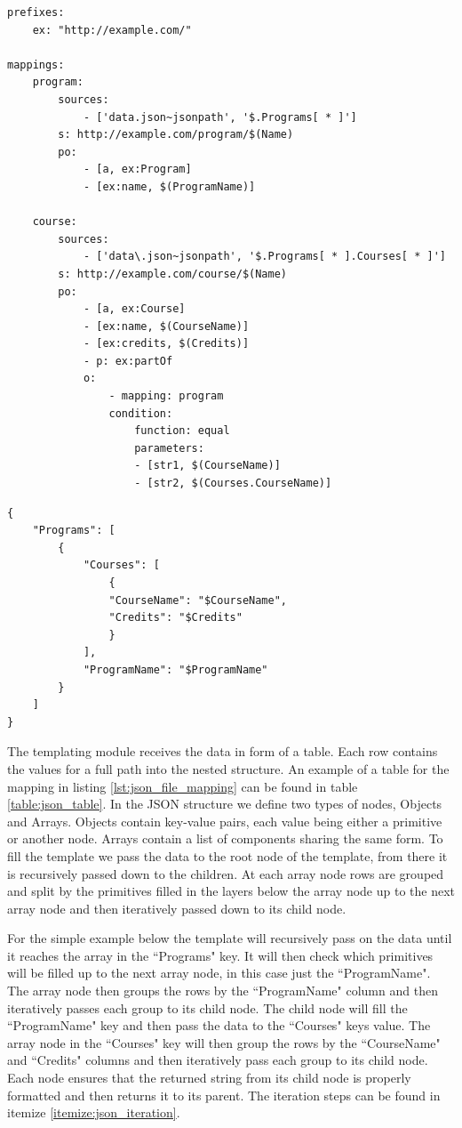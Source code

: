 \begin{lstlisting}[caption={Example YARRRML mapping for a JSON file}, label={lst:json_file_mapping}, captionpos=b, basicstyle=\small, float=!ht, frame=single]
prefixes:
    ex: "http://example.com/"

mappings:
    program:
        sources:
            - ['data.json~jsonpath', '$.Programs[ * ]']
        s: http://example.com/program/$(Name)
        po:
            - [a, ex:Program]
            - [ex:name, $(ProgramName)]

    course:
        sources:
            - ['data\.json~jsonpath', '$.Programs[ * ].Courses[ * ]']
        s: http://example.com/course/$(Name)
        po:
            - [a, ex:Course]
            - [ex:name, $(CourseName)]
            - [ex:credits, $(Credits)]
            - p: ex:partOf
            o: 
                - mapping: program
                condition: 
                    function: equal
                    parameters:
                    - [str1, $(CourseName)]
                    - [str2, $(Courses.CourseName)]
\end{lstlisting}

\begin{lstlisting}[caption={Example JSON template}, label={lst:json_template}, captionpos=b, basicstyle=\small, float=!ht, frame=single]
{
    "Programs": [
        {
            "Courses": [
                {
                "CourseName": "$CourseName",
                "Credits": "$Credits"
                }
            ],
            "ProgramName": "$ProgramName"
        }
    ]
}
\end{lstlisting}

The templating module receives the data in form of a table. Each row contains the values for a full path into the nested structure. An example of a table for the mapping in listing \ref{lst:json_file_mapping} can be found in table \ref{table:json_table}. In the JSON structure we define two types of nodes, Objects and Arrays. Objects contain key-value pairs, each value being either a primitive or another node. Arrays contain a list of components sharing the same form. To fill the template we pass the data to the root node of the template, from there it is recursively passed down to the children. At each array node rows are grouped and split by the primitives filled in the layers below the array node up to the next array node and then iteratively passed down to its child node.

For the simple example below the template will recursively pass on the data until it reaches the array in the ``Programs" key. It will then check which primitives will be filled up to the next array node, in this case just the ``ProgramName". The array node then groups the rows by the ``ProgramName" column and then iteratively passes each group to its child node. The child node will fill the ``ProgramName" key and then pass the data to the ``Courses" keys value. The array node in the ``Courses" key will then group the rows by the ``CourseName" and ``Credits" columns and then iteratively pass each group to its child node. Each node ensures that the returned string from its child node is properly formatted and then returns it to its parent. The iteration steps can be found in itemize \ref{itemize:json_iteration}.

